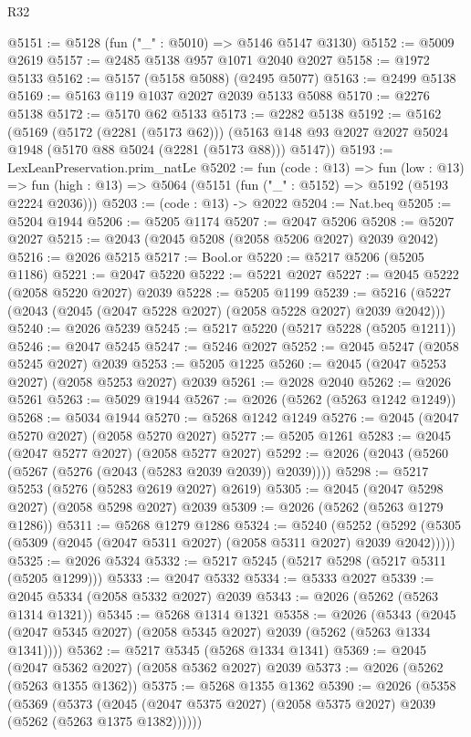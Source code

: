 \begin{lexlean}{R32}
\begin{coremodule}
@5151 := @5128 (fun ("_" : @5010) => @5146 @5147 @3130)
@5152 := @5009 @2619
@5157 := @2485 @5138 @957 @1071 @2040 @2027
@5158 := @1972 @5133
@5162 := @5157 (@5158 @5088) (@2495 @5077)
@5163 := @2499 @5138
@5169 := @5163 @119 @1037 @2027 @2039 @5133 @5088
@5170 := @2276 @5138
@5172 := @5170 @62 @5133
@5173 := @2282 @5138
@5192 := @5162
    (@5169
      (@5172 (@2281 (@5173 @62)))
      (@5163 @148 @93 @2027 @2027 @5024 @1948 (@5170 @88 @5024 (@2281 (@5173 @88))) @5147))
@5193 := LexLeanPreservation.prim_natLe
@5202 := fun (code : @13) =>
  fun (low : @13) =>
  fun (high : @13) => @5064 (@5151 (fun ("_" : @5152) => @5192 (@5193 @2224 @2036)))
@5203 := (code : @13) -> @2022
@5204 := Nat.beq
@5205 := @5204 @1944
@5206 := @5205 @1174
@5207 := @2047 @5206
@5208 := @5207 @2027
@5215 := @2043 (@2045 @5208 (@2058 @5206 @2027) @2039 @2042)
@5216 := @2026 @5215
@5217 := Bool.or
@5220 := @5217 @5206 (@5205 @1186)
@5221 := @2047 @5220
@5222 := @5221 @2027
@5227 := @2045 @5222 (@2058 @5220 @2027) @2039
@5228 := @5205 @1199
@5239 := @5216 (@5227 (@2043 (@2045 (@2047 @5228 @2027) (@2058 @5228 @2027) @2039 @2042)))
@5240 := @2026 @5239
@5245 := @5217 @5220 (@5217 @5228 (@5205 @1211))
@5246 := @2047 @5245
@5247 := @5246 @2027
@5252 := @2045 @5247 (@2058 @5245 @2027) @2039
@5253 := @5205 @1225
@5260 := @2045 (@2047 @5253 @2027) (@2058 @5253 @2027) @2039
@5261 := @2028 @2040
@5262 := @2026 @5261
@5263 := @5029 @1944
@5267 := @2026 (@5262 (@5263 @1242 @1249))
@5268 := @5034 @1944
@5270 := @5268 @1242 @1249
@5276 := @2045 (@2047 @5270 @2027) (@2058 @5270 @2027)
@5277 := @5205 @1261
@5283 := @2045 (@2047 @5277 @2027) (@2058 @5277 @2027)
@5292 := @2026 (@2043 (@5260 (@5267 (@5276 (@2043 (@5283 @2039 @2039)) @2039))))
@5298 := @5217 @5253 (@5276 (@5283 @2619 @2027) @2619)
@5305 := @2045 (@2047 @5298 @2027) (@2058 @5298 @2027) @2039
@5309 := @2026 (@5262 (@5263 @1279 @1286))
@5311 := @5268 @1279 @1286
@5324 := @5240
    (@5252 (@5292 (@5305 (@5309 (@2045 (@2047 @5311 @2027) (@2058 @5311 @2027) @2039 @2042)))))
@5325 := @2026 @5324
@5332 := @5217 @5245 (@5217 @5298 (@5217 @5311 (@5205 @1299)))
@5333 := @2047 @5332
@5334 := @5333 @2027
@5339 := @2045 @5334 (@2058 @5332 @2027) @2039
@5343 := @2026 (@5262 (@5263 @1314 @1321))
@5345 := @5268 @1314 @1321
@5358 := @2026
    (@5343 (@2045 (@2047 @5345 @2027) (@2058 @5345 @2027) @2039 (@5262 (@5263 @1334 @1341))))
@5362 := @5217 @5345 (@5268 @1334 @1341)
@5369 := @2045 (@2047 @5362 @2027) (@2058 @5362 @2027) @2039
@5373 := @2026 (@5262 (@5263 @1355 @1362))
@5375 := @5268 @1355 @1362
@5390 := @2026
    (@5358
      (@5369
        (@5373 (@2045 (@2047 @5375 @2027) (@2058 @5375 @2027) @2039 (@5262 (@5263 @1375 @1382))))))

\end{coremodule}
\end{lexlean}

